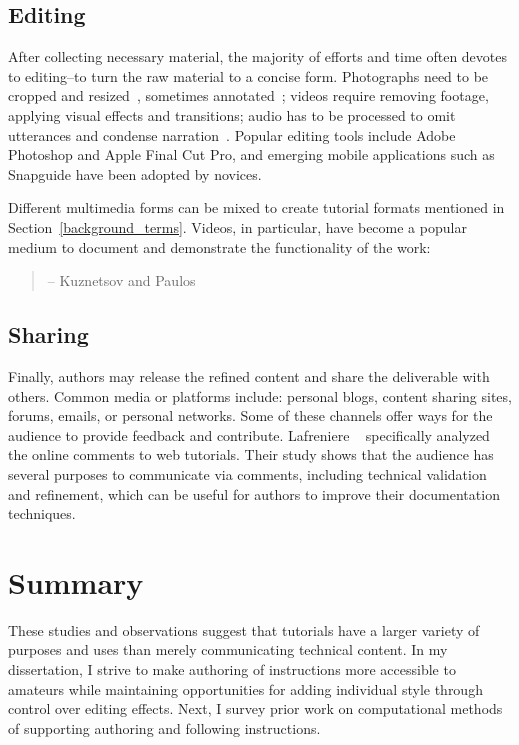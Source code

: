 \subsection{Editing}
After collecting necessary material, the majority of efforts and time often devotes to editing--to turn the raw material to a concise form.
Photographs need to be cropped and resized~\cite{Tseng:2014:PVP:2598510.2598540}, sometimes annotated~\cite{Torrey:2007he}; videos require removing footage, applying visual effects and transitions; audio has to be processed to omit utterances and condense narration~\cite{Chi:2013:DGC:2501988.2502052}. Popular editing tools include Adobe Photoshop and Apple Final Cut Pro, and emerging mobile applications such as Snapguide have been adopted by novices.

Different multimedia forms can be mixed to create tutorial formats mentioned in Section~\ref{background_terms}. Videos, in particular, have become a popular medium to document and demonstrate the functionality of the work:

\begin{quote}
 -- Kuznetsov and Paulos~\cite{Kuznetsov:2010:REA:1868914.1868950}
\end{quote}

\subsection{Sharing}
Finally, authors may release the refined content and share the deliverable with others. Common media or platforms include: personal blogs, content sharing sites, forums, emails, or personal networks.
%
Some of these channels offer ways for the audience to provide feedback and contribute. Lafreniere \ea{}~\cite{Lafreniere:2012tl} specifically analyzed the online comments to web tutorials. Their study shows that the audience has several purposes to communicate via comments, including technical validation and refinement, which can be useful for authors to improve their documentation techniques.



\section{Summary}

These studies and observations suggest that tutorials have a larger variety of purposes and uses than merely communicating technical content.
%
In my dissertation, I strive to make authoring of instructions more accessible to amateurs while maintaining opportunities for adding individual style through control over editing effects.
%
Next, I survey prior work on computational methods of supporting authoring and following instructions.
